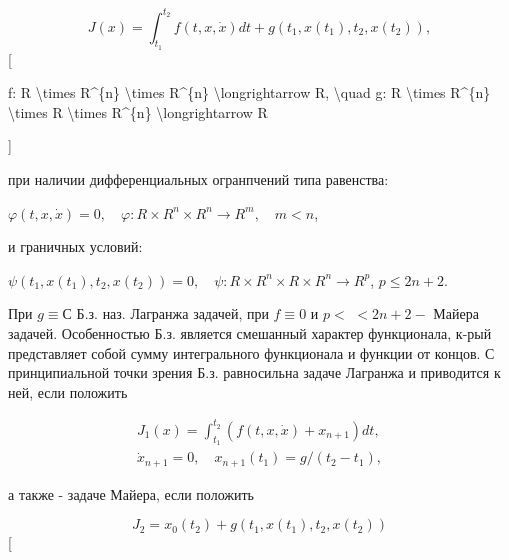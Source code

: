 \documentclass[10pt]{article}
\begin{document}
\[

J(x)=\int_{t_{1}}^{t_{2}} f(t, x, \dot{x}) d t+g\left(t_{1}, x\left(t_{1}\right), t_{2}, x\left(t_{2}\right)\right),

\][



f: R \textbackslash times R\^{}\{n\} \textbackslash times R\^{}\{n\} \textbackslash longrightarrow R, \textbackslash quad g: R \textbackslash times R\^{}\{n\} \textbackslash times R \textbackslash times R\^{}\{n\} \textbackslash longrightarrow R

]



при наличии дифференциальных огранпчений типа равенства:



$\varphi(t, x, \dot{x})=0, \quad \varphi: R \times R^{n} \times R^{n} \longrightarrow R^{m}, \quad m<n$,



и граничных условий:



$\psi\left(t_{1}, x\left(t_{1}\right), t_{2}, x\left(t_{2}\right)\right)=0, \quad \psi: R \times R^{n} \times R \times R^{n} \longrightarrow R^{p}$, $p \leqslant 2 n+2$.



При $g \equiv С$ Б.з. наз. Лагранжа задачей, при $f \equiv 0$ и $p<$ $<2 n+2-$ Майера задачей. Особенностью Б.з. является смешанный характер функционала, к-рый представляет собой сумму интегрального функционала и функции от концов. С принципиальной точки зрения Б.з. равносильна задаче Лагранжа и приводится к ней, если положить



\[

\begin{gathered}

J_{1}(x)=\int_{t_{1}}^{t_{2}}\left(f(t, x, \dot{x})+x_{n+1}\right) d t, \\

\dot{x}_{n+1}=0, \quad x_{n+1}\left(t_{1}\right)=g /\left(t_{2}-t_{1}\right),

\end{gathered}

\]



а также - задаче Майера, если положить



\[

J_{2}=x_{0}\left(t_{2}\right)+g\left(t_{1}, x\left(t_{1}\right), t_{2}, x\left(t_{2}\right)\right)

\][
\end{document}
